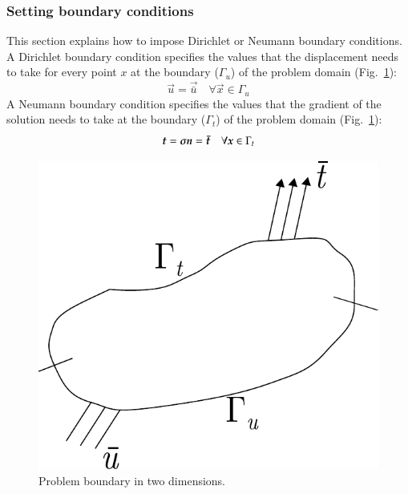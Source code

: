\subsubsection{Setting boundary conditions\label{sect:smm:boundary}}
This section explains how to  impose Dirichlet or Neumann boundary conditions. A
Dirichlet boundary condition specifies the values that the displacement needs to
take for every point $x$ at    the    boundary     ($\Gamma_u$)    of    the    problem    domain
(Fig.~\ref{fig:smm:boundaries}):
\begin{equation}
  \vec{u} = \vec{\bar u} \quad \forall \vec{x}\in \Gamma_{u}
\end{equation}
A  Neumann boundary  condition specifies  the values  that the  gradient  of the
solution  needs to  take  at the  boundary  ($\Gamma_t$) of  the problem  domain
(Fig.~\ref{fig:smm:boundaries}):
\begin{equation}
  \boldsymbol{t} = \boldsymbol{\sigma} \boldsymbol{n} = \boldsymbol{\bar t} \quad \forall \boldsymbol{x}\in \Gamma_{t}
\end{equation}
\begin{figure}[!htb]
  \centering
  \includegraphics[scale=0.6]{figures/boundary}
  \caption{Problem boundary in two dimensions.\label{fig:smm:boundaries}}
\end{figure}

